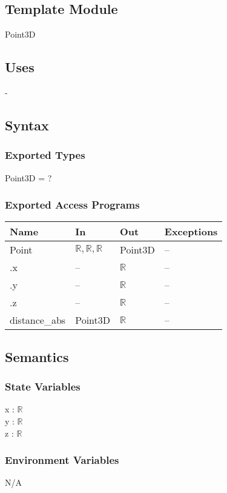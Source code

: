 \documentclass[12pt, titlepage]{article}
\begin{document}
\subsection{Template Module}
Point3D

\subsection{Uses} -

\subsection{Syntax}
\subsubsection{Exported Types}
Point3D = ?

\subsubsection{Exported Access Programs}
\begin{center}
	\begin{tabular}{p{4cm} p{2cm} p{2cm} p{4cm}}
		\hline
		\textbf{Name} & \textbf{In} & \textbf{Out} & \textbf{Exceptions} \\
		\hline
		Point & $\mathbb{R}, \mathbb{R}, \mathbb{R}$ & Point3D & -- \\
		.x & -- & $\mathbb{R}$ & -- \\
		.y & -- & $\mathbb{R}$ & -- \\		
		.z & -- & $\mathbb{R}$ & -- \\
		distance\_abs & Point3D & $\mathbb{R}$ & -- \\
		\hline
	\end{tabular}
\end{center}

\subsection{Semantics}
\subsubsection{State Variables}
x : $\mathbb{R}$ \\
y : $\mathbb{R}$ \\
z : $\mathbb{R}$ \\

\subsubsection{Environment Variables}
N/A
\end{document}
